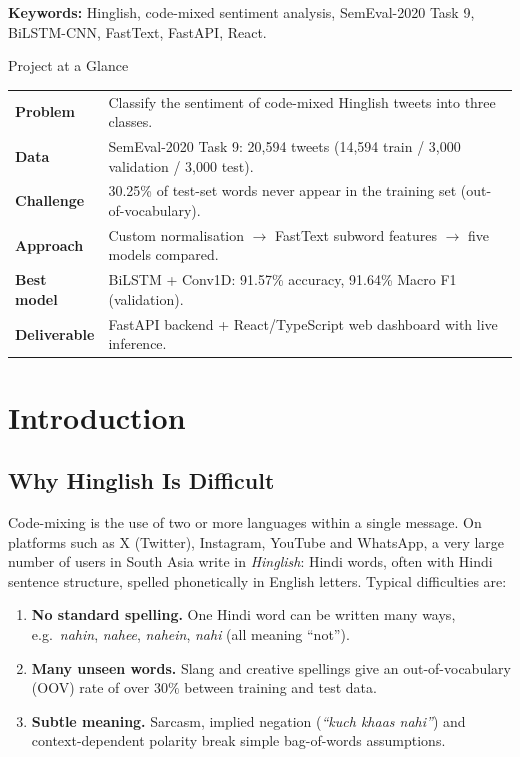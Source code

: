 \documentclass[11pt,a4paper]{article}
\begin{document}
\noindent\textbf{Keywords:} Hinglish, code-mixed sentiment analysis, SemEval-2020 Task 9, BiLSTM-CNN, FastText, FastAPI, React.

\begin{keybox}{Project at a Glance}
\small
\begin{tabularx}{\textwidth}{@{}lX@{}}
\textbf{Problem}   & Classify the sentiment of code-mixed Hinglish tweets into three classes. \\
\textbf{Data}      & SemEval-2020 Task 9: 20,594 tweets (14,594 train / 3,000 validation / 3,000 test). \\
\textbf{Challenge} & 30.25\% of test-set words never appear in the training set (out-of-vocabulary). \\
\textbf{Approach}  & Custom normalisation $\rightarrow$ FastText subword features $\rightarrow$ five models compared. \\
\textbf{Best model}& BiLSTM + Conv1D: 91.57\% accuracy, 91.64\% Macro F1 (validation). \\
\textbf{Deliverable}& FastAPI backend + React/TypeScript web dashboard with live inference. \\
\end{tabularx}
\end{keybox}

\newpage
{\setlength{\parskip}{0pt}\small\tableofcontents}
\newpage

\section{Introduction}

\subsection{Why Hinglish Is Difficult}
Code-mixing is the use of two or more languages within a single message. On platforms such as X (Twitter), Instagram, YouTube and WhatsApp, a very large number of users in South Asia write in \textit{Hinglish}: Hindi words, often with Hindi sentence structure, spelled phonetically in English letters. Typical difficulties are:

\begin{enumerate}
    \item \textbf{No standard spelling.} One Hindi word can be written many ways, e.g.\ \textit{nahin}, \textit{nahee}, \textit{nahein}, \textit{nahi} (all meaning ``not'').
    \item \textbf{Many unseen words.} Slang and creative spellings give an out-of-vocabulary (OOV) rate of over $30\%$ between training and test data.
    \item \textbf{Subtle meaning.} Sarcasm, implied negation (\textit{``kuch khaas nahi''}) and context-dependent polarity break simple bag-of-words assumptions.
\end{enumerate}
\end{document}
